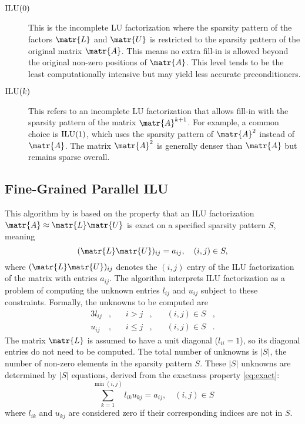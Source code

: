\begin{description}
\item[\(\operatorname{ILU}(0)\)] This is the incomplete LU factorization where the sparsity pattern of
  the factors \(\matr{L}\) and \(\matr{U}\) is restricted to the sparsity
  pattern of the original matrix \(\matr{A}\). This means no extra fill-in is
  allowed beyond the original non-zero positions of \(\matr{A}\). This level
  tends to be the least computationally intensive but may yield less accurate
  preconditioners.
\item[\(\operatorname{ILU}(k)\)] This refers to an incomplete LU factorization that allows
  fill-in with the sparsity pattern of the matrix \(\matr{A}^{k+1}\). For
  example, a common choice is \(\operatorname{ILU}(1)\), which uses the sparsity pattern of
  \(\matr{A}^{2}\) instead of \(\matr{A}\). The matrix \(\matr{A}^{2}\)
  is generally denser than \(\matr{A}\) but remains sparse overall.
\end{description}

\subsection{Fine-Grained Parallel ILU}
\label{sec:fine-grain-parall}

This algorithm by \textcite{chow_fine-grained_2015} is based on the property that
an ILU factorization \(\matr{A} \approx \matr{L} \matr{U}\) is exact on a specified
sparsity pattern \(S\), meaning
\begin{equation}
  \label{eq:exact}
  (\matr{L}\matr{U})_{ij} = a_{ij}, \quad (i,j) \in S,
\end{equation}
where \((\matr{L}\matr{U})_{ij}\) denotes the \((i,j)\) entry of the ILU
factorization of the matrix with entries \(a_{ij}\). The algorithm interprets
ILU factorization as a problem of computing the unknown entries \(l_{ij}\) and
\(u_{ij}\) subject to these constraints. Formally, the unknowns to be computed
are
\begin{alignat*}{3}
  l_{ij}&,\quad & i > j&,\quad & (i,j) \in S&, \\
  u_{ij}&,\quad & i \le j&,\quad & (i,j) \in S&.
\end{alignat*}
The matrix \(\matr{L}\) is assumed to have a unit diagonal (\(l_{ii} = 1\)), so
its diagonal entries do not need to be computed. The total number of unknowns is
\(|S|\), the number of non-zero elements in the sparsity pattern \(S\). These
\(|S|\) unknowns are determined by \(|S|\) equations, derived from the exactness
property \eqref{eq:exact}: \[\sum_{k=1}^{\min(i,j)}l_{ik}u_{kj} = a_{ij},\quad
  (i,j) \in S\] where \(l_{ik}\) and \(u_{kj}\) are considered zero if their
corresponding indices are not in \(S\).

